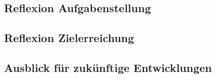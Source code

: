 \subsection{Reflexion Aufgabenstellung}

\subsection{Reflexion Zielerreichung}

\subsection{Ausblick für zukünftige Entwicklungen}